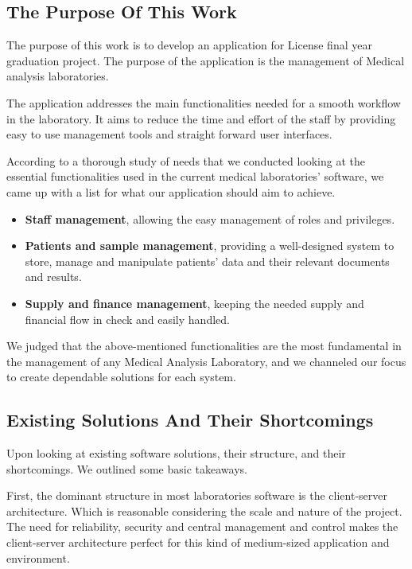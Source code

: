 \documentclass{article}
\begin{document}
\subsection[The Purpose Of This Work]{The Purpose Of This Work}

The purpose of this work is to develop an application for License final year graduation project. The purpose of the application is the management of Medical analysis laboratories.

The application addresses the main functionalities needed for a smooth workflow in the laboratory. It aims to reduce the time and effort of the staff by providing easy to use management tools and straight forward user interfaces.

According to a thorough study of needs that we conducted looking at the essential functionalities used in the current medical laboratories' software, we came up with a list for what our application should aim to achieve.

\begin{itemize}
    \item \textbf{Staff management}, allowing the easy management of roles and privileges.
    \item \textbf{Patients and sample management}, providing a well-designed system to store, manage and manipulate patients' data and their relevant documents and results.
    \item \textbf{Supply and finance management}, keeping the needed supply and financial flow in check and easily handled.
\end{itemize}

We judged that the above-mentioned functionalities are the most fundamental in the management of any Medical Analysis Laboratory, and we channeled our focus to create dependable solutions for each system.


\subsection[Existing Solutions And Their Shortcomings]{Existing Solutions And Their Shortcomings}

Upon looking at existing software solutions, their structure, and their shortcomings. We outlined some basic takeaways.

First, the dominant structure in most laboratories software is the client-server architecture. Which is reasonable considering the scale and nature of the project.
The need for reliability, security and central management and control makes the client-server architecture perfect for this kind of medium-sized application and environment.
\end{document}
